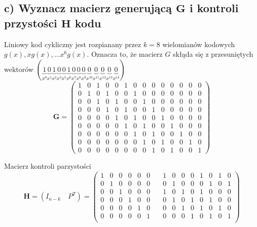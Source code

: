 \documentclass[12pt]{article}
\begin{document}
    \subsection*{c) Wyznacz macierz generującą $\mathbf{G}$ i kontroli przystości $\mathbf{H}$ kodu} 
    Liniowy kod cykliczny jest rozpianany przez $k=8$ wielomianów kodowych $g(x),xg(x),\dots x^{6}g(x)$. 
    Oznacza to, że macierz $G$ skłąda się z przesuniętych wektorów 
    $ ( \underbrace{1}_{x^0}
      \underbrace{0}_{x^1}
      \underbrace{1}_{x^2}
      \underbrace{0}_{x^3}
      \underbrace{0}_{x^5}
      \underbrace{1}_{x^6}
      \underbrace{0}_{x^7}
      \underbrace{0}_{x^8}
      \underbrace{0}_{x^9}
      \underbrace{0}_{x^{10}}
      \underbrace{0}_{x^{11}}
      \underbrace{0}_{x^{12}}
      \underbrace{0}_{x^{13}}
      \underbrace{0}_{x^{14}}
    )
    $ 
    \begin{equation*}
        \mathbf{G} = \begin{pmatrix}
           1 & 0 & 1 & 0 & 0 & 1 & 0 & 0 & 0 & 0 & 0 & 0 & 0 & 0  \\
           0 & 1 & 0 & 1 & 0 & 0 & 1 & 0 & 0 & 0 & 0 & 0 & 0 & 0  \\ 
           0 & 0 & 1 & 0 & 1 & 0 & 0 & 1 & 0 & 0 & 0 & 0 & 0 & 0  \\ 
           0 & 0 & 0 & 1 & 0 & 1 & 0 & 0 & 1 & 0 & 0 & 0 & 0 & 0  \\ 
           0 & 0 & 0 & 0 & 1 & 0 & 1 & 0 & 0 & 1 & 0 & 0 & 0 & 0  \\ 
           0 & 0 & 0 & 0 & 0 & 1 & 0 & 1 & 0 & 0 & 1 & 0 & 0 & 0  \\ 
           0 & 0 & 0 & 0 & 0 & 0 & 1 & 0 & 1 & 0 & 0 & 1 & 0 & 0  \\ 
           0 & 0 & 0 & 0 & 0 & 0 & 0 & 1 & 0 & 1 & 0 & 0 & 1 & 0  \\ 
           0 & 0 & 0 & 0 & 0 & 0 & 0 & 0 & 1 & 0 & 1 & 0 & 0 & 1 
       \end{pmatrix} 
    \end{equation*}

    Macierz kontroli parzystości
    \begin{equation*}
        \mathbf{H} = (I_{n-k} \quad P^T ) = \begin{pmatrix}
            1 & 0 & 0 & 0 & 0 & 0 &  \quad  1 & 0 & 0 & 0 & 1 & 0 & 1 & 0  \\
            0 & 1 & 0 & 0 & 0 & 0 &  \quad  0 & 1 & 0 & 0 & 0 & 1 & 0 & 1  \\
            0 & 0 & 1 & 0 & 0 & 0 &  \quad  1 & 0 & 1 & 0 & 1 & 0 & 0 & 0  \\
            0 & 0 & 0 & 1 & 0 & 0 &  \quad  0 & 1 & 0 & 1 & 0 & 1 & 0 & 0  \\
            0 & 0 & 0 & 0 & 1 & 0 &  \quad  0 & 0 & 1 & 0 & 1 & 0 & 1 & 0  \\
            0 & 0 & 0 & 0 & 0 & 1 &  \quad  0 & 0 & 0 & 1 & 0 & 1 & 0 & 1  \\
        \end{pmatrix}
    \end{equation*}
\end{document}
